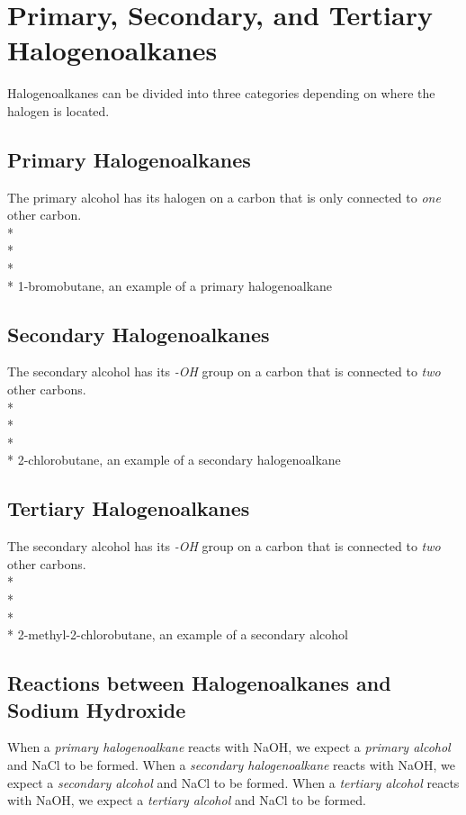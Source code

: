 \documentclass[11pt,twoside]{article}
\begin{document}
	\section{Primary, Secondary, and Tertiary Halogenoalkanes}
		Halogenoalkanes can be divided into three categories depending on where the halogen is located.
		\subsection{Primary Halogenoalkanes}
			The primary alcohol has its halogen on a carbon that is only connected to \emph{one} other carbon. 
			\\* \\*
			\\* \\*
			1-bromobutane, an example of a primary halogenoalkane
		\subsection{Secondary Halogenoalkanes}
			The secondary alcohol has its \emph{-OH} group on a carbon that is connected to \emph{two} other carbons.
			\\* \\*
			\\* \\*
			2-chlorobutane, an example of a secondary halogenoalkane
		\subsection{Tertiary Halogenoalkanes}
			The secondary alcohol has its \emph{-OH} group on a carbon that is connected to \emph{two} other carbons.
			\\* \\*
			\\* \\*
			2-methyl-2-chlorobutane, an example of a secondary alcohol
		\subsection{Reactions between Halogenoalkanes and Sodium Hydroxide}
			When a \emph{primary halogenoalkane} reacts with NaOH, we expect a \emph{primary alcohol} and NaCl to be formed. When a \emph{secondary halogenoalkane} reacts with NaOH, we expect a \emph{secondary alcohol} and NaCl to be formed. When a \emph{tertiary alcohol} reacts with NaOH, we expect a \emph{tertiary alcohol} and NaCl to be formed.
			
\end{document}
